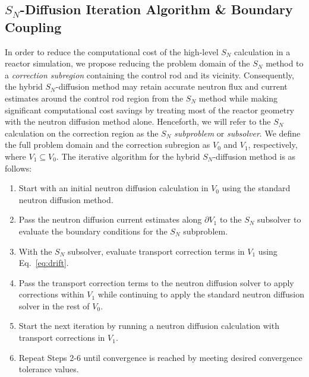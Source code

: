 \documentclass[letterpaper]{mc2025}
\begin{document}
\subsection{$S_N$-Diffusion Iteration Algorithm \& Boundary Coupling} \label{sec:hybrid-algorithm}

In order to reduce the computational cost of the high-level $S_N$ calculation in a reactor
simulation, we propose reducing the problem domain of the $S_N$ method to a
\textit{correction subregion} containing the control rod
and its vicinity. Consequently, the hybrid $S_N$-diffusion method may retain accurate neutron flux
and current estimates around the control rod region from the $S_N$ method while making significant
computational cost savings by treating most of the reactor geometry with the neutron diffusion
method alone. Henceforth, we will refer to the $S_N$ calculation on the correction
region as the $S_N$ \textit{subproblem} or \textit{subsolver}. We define the full problem
domain and the correction subregion as $V_0$ and $V_1$, respectively, where
$V_1\subseteq V_0$. The iterative algorithm for the hybrid $S_N$-diffusion method is as follows:
%
\begin{enumerate}
  \item Start with an initial neutron diffusion calculation in $V_0$ using the standard neutron
    diffusion method.
  \item Pass the neutron diffusion current estimates along
    $\partial V_1$ to the $S_N$ subsolver to evaluate the boundary conditions for the $S_N$
    subproblem.
  \item With the $S_N$ subsolver, evaluate transport correction terms in $V_1$ using Eq.\
    \ref{eq:drift}.
  \item Pass the transport correction terms to the neutron diffusion solver to apply corrections
    within $V_1$ while continuing to apply the standard neutron diffusion solver
    in the rest of $V_0$.
  \item Start the next iteration by running a neutron diffusion calculation with transport
    corrections in $V_1$.
  \item Repeat Steps 2-6 until convergence is reached by meeting desired convergence tolerance
    values.
\end{enumerate}
\end{document}
